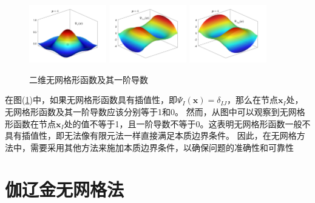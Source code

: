 \begin{figure}[H]
\begin{subcaptiongroup}
\label{dshape}
\label{dshape}
\end{subcaptiongroup}
\begin{subcaptiongroup}
\includegraphics[width=0.3\textwidth]{figure/nomesh/Qt1.png}
\label{shape}
\includegraphics[width=0.3\textwidth]{figure/nomesh/Qt2.png}
\label{dshape}
\includegraphics[width=0.3\textwidth]{figure/nomesh/Qt3.png}
\label{dshape}
\label{dshape}
\end{subcaptiongroup}
\caption{二维无网格形函数及其一阶导数}\label{gradient}
\end{figure}
在图(\ref{gradient})中，如果无网格形函数具有插值性，即$\Psi_I(\pmb{x})=\delta_{IJ}$，那么在节点$\pmb{x}_I$处，无网格形函数及其一阶导数应该分别等于1和0。
然而，从图中可以观察到无网格形函数在节点$\pmb{x}_I$处的值不等于1，且一阶导数不等于0。这表明无网格形函数一般不具有插值性，即无法像有限元法一样直接满足本质边界条件。
因此，在无网格方法中，需要采用其他方法来施加本质边界条件，以确保问题的准确性和可靠性
\section{伽辽金无网格法}
